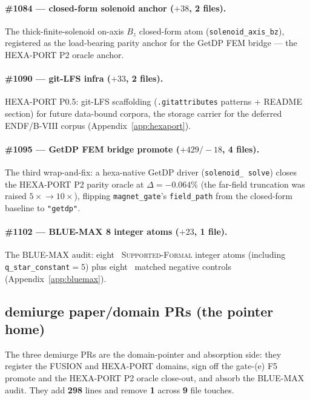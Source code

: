 \paragraph{\#1084 --- closed-form solenoid anchor ($+38$, 2 files).}
The thick-finite-solenoid on-axis $B_z$ closed-form atom
(\verb|solenoid_axis_bz|), registered as the load-bearing parity anchor
for the GetDP FEM bridge --- the HEXA-PORT P2 oracle anchor.

\paragraph{\#1090 --- git-LFS infra ($+33$, 2 files).}
HEXA-PORT P0.5: git-LFS scaffolding (\texttt{.gitattributes} patterns +
README section) for future data-bound corpora, the storage carrier for
the deferred ENDF/B-VIII corpus (Appendix~\ref{app:hexaport}).

\paragraph{\#1095 --- GetDP FEM bridge promote ($+429/-18$, 4 files).}
The third wrap-and-fix: a hexa-native GetDP driver (\texttt{solenoid\_%
solve}) closes the HEXA-PORT P2 parity oracle at $\Delta=-0.064\%$ (the
far-field truncation was raised $5\times\!\rightarrow\!10\times$),
flipping \texttt{magnet\_gate}'s \texttt{field\_path} from the
closed-form baseline to \texttt{"getdp"}.

\paragraph{\#1102 --- BLUE-MAX 8 integer atoms ($+23$, 1 file).}
The BLUE-MAX audit: eight \tierBlue\ \textsc{Supported-Formal} integer
atoms (including \verb|q_star_constant|$=5$) plus eight \tierRed\
matched negative controls (Appendix~\ref{app:bluemax}).

\subsection{demiurge paper/domain PRs (the pointer home)}
\label{app:pr-roll:demiurge}

The three demiurge PRs are the domain-pointer and absorption side: they
register the FUSION and HEXA-PORT domains, sign off the gate-(e) F5
promote and the HEXA-PORT P2 oracle close-out, and absorb the BLUE-MAX
audit. They add \textbf{298} lines and remove \textbf{1} across
\textbf{9} file touches.

